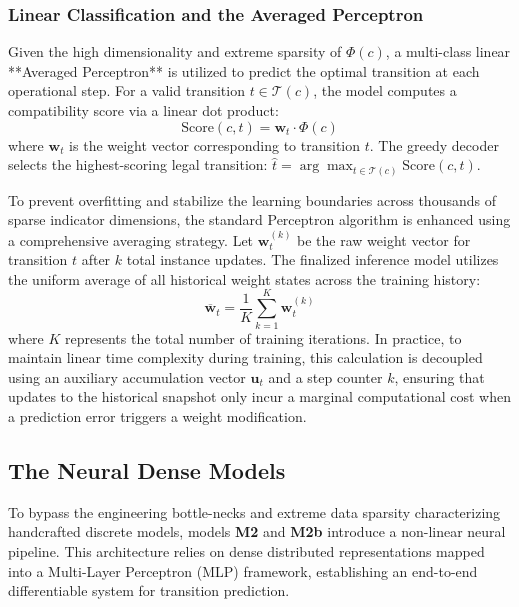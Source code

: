\documentclass[12pt,a4paper]{article}
\begin{document}
\subsubsection{Linear Classification and the Averaged Perceptron}
Given the high dimensionality and extreme sparsity of $\Phi(c)$, a multi-class linear **Averaged Perceptron** is utilized to predict the optimal transition at each operational step. For a valid transition $t \in \mathcal{T}(c)$, the model computes a compatibility score via a linear dot product:
\begin{equation}
    \text{Score}(c, t) = \mathbf{w}_t \cdot \Phi(c)
\end{equation}
where $\mathbf{w}_t$ is the weight vector corresponding to transition $t$. The greedy decoder selects the highest-scoring legal transition: $\hat{t} = \arg\max_{t \in \mathcal{T}(c)} \text{Score}(c, t)$.

To prevent overfitting and stabilize the learning boundaries across thousands of sparse indicator dimensions, the standard Perceptron algorithm is enhanced using a comprehensive averaging strategy. Let $\mathbf{w}_t^{(k)}$ be the raw weight vector for transition $t$ after $k$ total instance updates. The finalized inference model utilizes the uniform average of all historical weight states across the training history:
\begin{equation}
    \overline{\mathbf{w}}_t = \frac{1}{K} \sum_{k=1}^{K} \mathbf{w}_t^{(k)}
\end{equation}
where $K$ represents the total number of training iterations. In practice, to maintain linear time complexity during training, this calculation is decoupled using an auxiliary accumulation vector $\mathbf{u}_t$ and a step counter $k$, ensuring that updates to the historical snapshot only incur a marginal computational cost when a prediction error triggers a weight modification.

\subsection{The Neural Dense Models}
\label{subsec:neural_dense_models}

To bypass the engineering bottle-necks and extreme data sparsity characterizing handcrafted discrete models, models \textbf{M2} and \textbf{M2b} introduce a non-linear neural pipeline. This architecture relies on dense distributed representations mapped into a Multi-Layer Perceptron (MLP) framework, establishing an end-to-end differentiable system for transition prediction.
\end{document}
